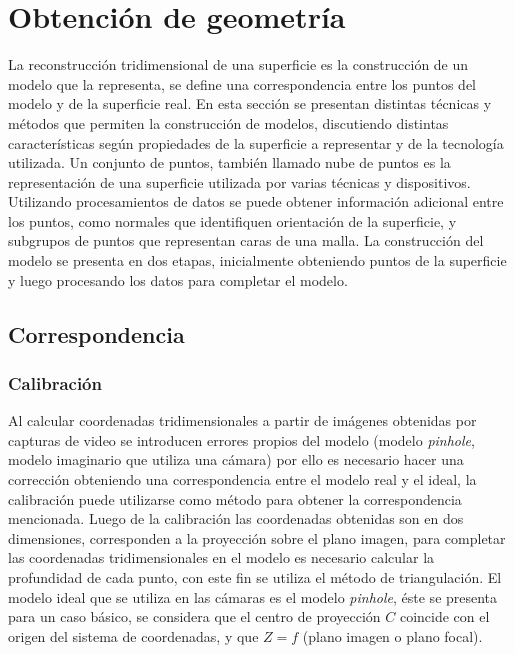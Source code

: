 \chapter{Obtención de geometría}

La reconstrucción tridimensional de una superficie es la construcción de un modelo que la representa, se define una correspondencia entre los puntos del modelo y de la superficie real. En esta sección se presentan distintas técnicas y métodos que permiten la construcción de modelos, discutiendo distintas características según propiedades de la superficie a representar y de la tecnología utilizada. Un conjunto de puntos, también llamado nube de puntos  es la representación de una superficie utilizada por varias técnicas y dispositivos. Utilizando procesamientos de datos se puede obtener información adicional entre los puntos, como normales que identifiquen orientación de la superficie, y subgrupos de puntos que representan caras de una malla. La construcción del modelo se presenta en dos etapas, inicialmente obteniendo puntos de la superficie y luego procesando los datos para completar el modelo.

\section{Correspondencia}

\subsection{Calibración}

Al calcular coordenadas tridimensionales a partir de imágenes obtenidas por capturas de video se introducen errores propios del modelo (modelo \emph{pinhole}, modelo imaginario que utiliza una cámara) por ello es necesario hacer una corrección obteniendo una correspondencia entre el modelo real y el ideal, la calibración puede utilizarse como método para obtener la correspondencia mencionada. Luego de la calibración las coordenadas obtenidas son en dos dimensiones, corresponden a la proyección sobre el plano imagen, para completar las coordenadas tridimensionales en el modelo es necesario calcular la profundidad de cada punto, con este fin se utiliza el método de triangulación. El modelo ideal que se utiliza en las cámaras es el modelo \emph{pinhole}, éste se presenta para un caso básico, se considera que el centro de proyección $C$ coincide con el origen del sistema de coordenadas, y que $Z = f$ (plano imagen o plano focal).

